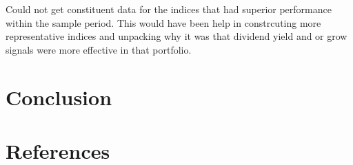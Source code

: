 \documentclass[11pt,preprint, authoryear]{elsarticle}
\numberwithin{equation}{section}
\numberwithin{figure}{section}
\numberwithin{table}{section}
\begin{document}
Could not get constituent data for the indices that had superior
performance within the sample period. This would have been help in
constrcuting more representative indices and unpacking why it was that
dividend yield and or grow signals were more effective in that
portfolio.

\hypertarget{conclusion}{%
\section{Conclusion}\label{conclusion}}

\hypertarget{references}{%
\section{References}\label{references}}

\hypertarget{refs}{}
\end{document}

